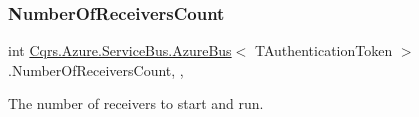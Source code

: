 \subsubsection{\texorpdfstring{Number\+Of\+Receivers\+Count}{NumberOfReceiversCount}}
{\footnotesize\ttfamily int \hyperlink{classCqrs_1_1Azure_1_1ServiceBus_1_1AzureBus}{Cqrs.\+Azure.\+Service\+Bus.\+Azure\+Bus}$<$ T\+Authentication\+Token $>$.Number\+Of\+Receivers\+Count\hspace{0.3cm}{\ttfamily [get]}, {\ttfamily [set]}, {\ttfamily [protected]}}



The number of receivers to start and run. 

